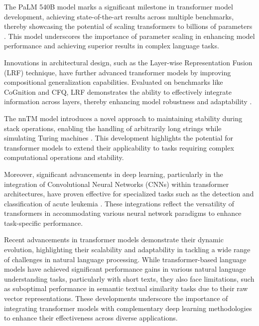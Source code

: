 The PaLM 540B model marks a significant milestone in transformer model development, achieving state-of-the-art results across multiple benchmarks, thereby showcasing the potential of scaling transformers to billions of parameters \cite{chowdhery2023palm}. This model underscores the importance of parameter scaling in enhancing model performance and achieving superior results in complex language tasks.



Innovations in architectural design, such as the Layer-wise Representation Fusion (LRF) technique, have further advanced transformer models by improving compositional generalization capabilities. Evaluated on benchmarks like CoGnition and CFQ, LRF demonstrates the ability to effectively integrate information across layers, thereby enhancing model robustness and adaptability \cite{zheng2023layerwiserepresentationfusioncompositional}.



The nnTM model introduces a novel approach to maintaining stability during stack operations, enabling the handling of arbitrarily long strings while simulating Turing machines \cite{stogin2022provablystableneuralnetwork}. This development highlights the potential for transformer models to extend their applicability to tasks requiring complex computational operations and stability.



Moreover, significant advancements in deep learning, particularly in the integration of Convolutional Neural Networks (CNNs) within transformer architectures, have proven effective for specialized tasks such as the detection and classification of acute leukemia \cite{zolfaghari2023surveyautomateddetectionclassification}. These integrations reflect the versatility of transformers in accommodating various neural network paradigms to enhance task-specific performance.



Recent advancements in transformer models demonstrate their dynamic evolution, highlighting their scalability and adaptability in tackling a wide range of challenges in natural language processing. While transformer-based language models have achieved significant performance gains in various natural language understanding tasks, particularly with short texts, they also face limitations, such as suboptimal performance in semantic textual similarity tasks due to their raw vector representations. These developments underscore the importance of integrating transformer models with complementary deep learning methodologies to enhance their effectiveness across diverse applications. \cite{ginzburg2021selfsuperviseddocumentsimilarityranking}



